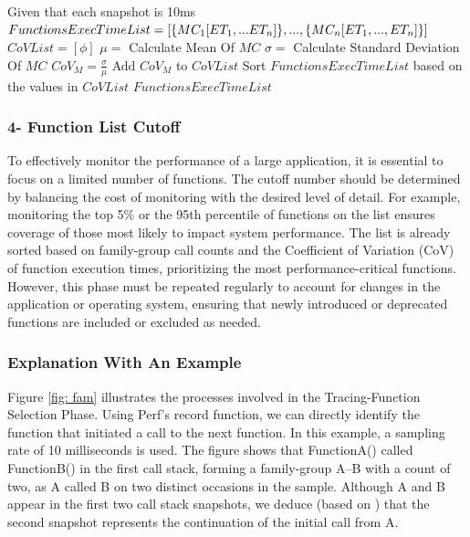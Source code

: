\documentclass[pdflatex,sn-nature]{sn-jnl}%
\theoremstyle{thmstyleone}%
\theoremstyle{thmstyletwo}%
\theoremstyle{thmstylethree}%
\begin{document}
\begin{algorithm}[tbp]

  \caption{CoV Ranking of Function Calls}\label{covranking}
  \begin{algorithmic}[1]
    \State Given that each snapshot is 10ms
    \State $FunctionsExecTimeList=[\{MC_1[ET_1,...ET_n]\},...,\newline\{MC_n[ET_1,...,ET_n]\}]$
    \State $CoVList=[\phi]$
        \State $\mu =$ Calculate Mean Of $MC$
        \State $\sigma =$ Calculate Standard Deviation Of $MC$
        \State $CoV_M = \frac{\sigma}{\mu}$
        \State Add $CoV_M$ to $CoVList$
    \EndFor
    \State Sort $FunctionsExecTimeList$ based on the values in $CoVList$
    \State \Return $FunctionsExecTimeList$
    
    
  \end{algorithmic}
\end{algorithm}

\subsubsection{4- Function List Cutoff}\label{cutoffsec}

To effectively monitor the performance of a large application, it is essential to focus on a limited number of functions. The cutoff number should be determined by balancing the cost of monitoring with the desired level of detail. For example, monitoring the top 5\% or the 95th percentile of functions on the list ensures coverage of those most likely to impact system performance. The list is already sorted based on family-group call counts and the Coefficient of Variation (CoV) of function execution times, prioritizing the most performance-critical functions. However, this phase must be repeated regularly to account for changes in the application or operating system, ensuring that newly introduced or deprecated functions are included or excluded as needed.


\subsubsection{Explanation With An Example}
Figure \ref{fig: fam} illustrates the processes involved in the Tracing-Function Selection Phase. Using Perf's record function, we can directly identify the function that initiated a call to the next function. In this example, a sampling rate of 10 milliseconds is used. The figure shows that FunctionA() called FunctionB() in the first call stack, forming a family-group A--B with a count of two, as A called B on two distinct occasions in the sample. Although A and B appear in the first two call stack snapshots, we deduce (based on \cite{han2012performance}) that the second snapshot represents the continuation of the initial call from A.
\end{document}
